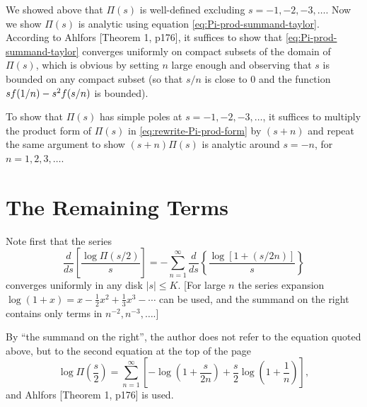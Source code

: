 \documentclass{note}
\numberwithin{equation}{chapter}
\begin{document}
We showed above that $\Pi(s)$ is well-defined excluding $s = -1, -2, -3,
    \dots$. Now we show $\Pi(s)$ is analytic using equation
\eqref{eq:Pi-prod-summand-taylor}. According to Ahlfors [Theorem 1, p176], it
suffices to show that \eqref{eq:Pi-prod-summand-taylor} converges uniformly on
compact subsets of the domain of $\Pi(s)$, which is obvious by setting $n$
large enough and observing that $s$ is bounded on any compact subset (so that
$s/n$ is close to $0$ and the function $s f\prn{1/n} - s^2 f\prn{s/n}$ is
bounded).

To show that $\Pi(s)$ has simple poles at $s = -1, -2, -3, \dots$, it suffices
to multiply the product form of $\Pi(s)$ in \eqref{eq:rewrite-Pi-prod-form} by
$(s+n)$ and repeat the same argument to show $(s+n)\Pi(s)$ is analytic around
$s = -n$, for $n = 1, 2, 3, \dots$.

\setcounter{section}{15}
\section{The Remaining Terms}


\begin{quotebar}
    Note first that the series
    \[
        \frac{d}{ds} \left[ \frac{\log \Pi(s/2)}{s} \right] = -\sum_{n=1}^\infty
        \frac{d}{ds} \left\{ \frac{\log[1 + (s/2n)]}{s} \right\}
    \]
    converges uniformly in any disk $|s| \leq K$. [For large $n$ the series expansion
            $\log(1 + x) = x - \frac{1}{2}x^2 + \frac{1}{3}x^3 - \cdots$ can be used, and the
            summand on the right contains only terms in $n^{-2}, n^{-3}, \ldots.$]
\end{quotebar}

By ``the summand on the right'', the author does not refer to the equation quoted above,
but to the second equation at the top of the page
\[
    \log \Pi\left(\frac{s}{2}\right) = \sum_{n=1}^\infty \left[ -\log\left(1 +
        \frac{s}{2n}\right) + \frac{s}{2} \log\left(1 + \frac{1}{n}\right) \right],
\]
and Ahlfors [Theorem 1, p176] is used.
\end{document}
